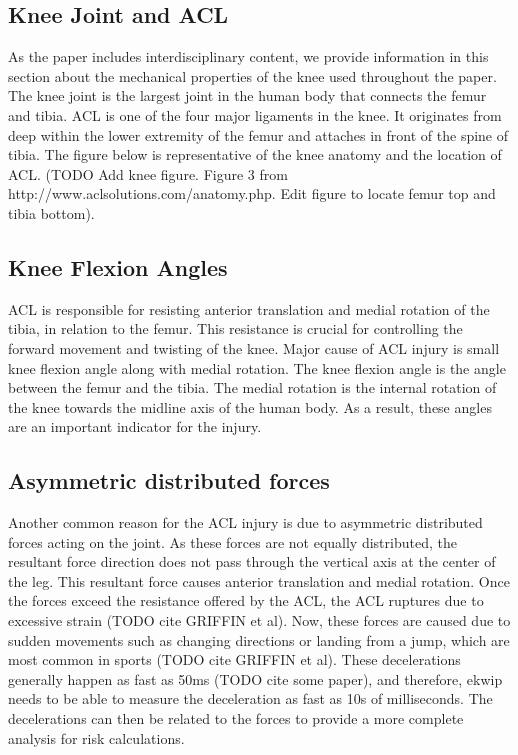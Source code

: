 \subsection{Knee Joint and ACL} 
As the paper includes interdisciplinary content, we provide information in this section about the mechanical properties of the knee used throughout the paper. The knee joint is the largest joint in the human body that connects the femur and tibia. ACL is one of the four major ligaments in the knee. It originates from deep within the lower extremity of the femur and attaches in front of the spine of tibia. The figure below is representative of the knee anatomy and the location of ACL. 
(TODO Add knee figure. Figure 3 from http://www.aclsolutions.com/anatomy.php. Edit figure to locate femur top and tibia bottom).

\subsection{Knee Flexion Angles}
ACL is responsible for resisting anterior translation and medial rotation of the tibia, in relation to the femur. This resistance is crucial for controlling the forward movement and twisting of the knee. Major cause of ACL injury is small knee flexion angle along with medial rotation. The knee flexion angle is the angle between the femur and the tibia. The medial rotation is the internal rotation of the knee towards the midline axis of the human body. As a result, these angles are an important indicator for the injury.

\subsection{Asymmetric distributed forces}
Another common reason for the ACL injury is due to asymmetric distributed forces acting on the joint. As these forces are not equally distributed, the resultant force direction does not pass through the vertical axis at the center of the leg. This resultant force causes anterior translation and medial rotation. Once the forces exceed the resistance offered by the ACL,  the ACL ruptures due to excessive strain (TODO cite GRIFFIN et al). Now, these forces are caused due to sudden movements such as changing directions or landing from a jump, which are most common in sports (TODO cite GRIFFIN et al). These decelerations generally happen as fast as 50ms (TODO cite some paper), and therefore, ekwip needs to be able to measure the deceleration as fast as 10s of milliseconds. The decelerations can then be related to the forces to provide a more complete analysis for risk calculations.